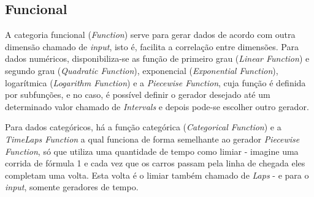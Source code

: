 \documentclass[
	12pt,				%
	openright,			%
	twoside,			%
	a4paper,			%
	english,			%
	brazil				%
	]{abntex2}
\begin{document}
		\subsection{Funcional}
			A categoria funcional (\emph{Function}) serve para gerar dados de acordo com outra dimensão chamado de \emph{input}, isto é, facilita a correlação entre dimensões.
			Para dados numéricos, disponibiliza-se as 
				função de primeiro grau (\emph{Linear Function}) e 
				segundo grau (\emph{Quadratic Function}), 
				exponencial (\emph{Exponential Function}), 
				logarítmica (\emph{Logarithm Function}) e
				a \emph{Piecewise Function}, cuja função é definida por subfunções, e no caso, é possível definir o gerador desejado até um determinado valor chamado de \emph{Intervals} e depois pode-se escolher outro gerador.
			\par
			Para dados categóricos, há a função categórica (\emph{Categorical Function}) e 
			a \emph{TimeLaps Function} a qual funciona de forma semelhante ao gerador \emph{Piecewise Function}, só que utiliza uma quantidade de tempo como limiar - imagine uma corrida de fórmula 1 e cada vez que os carros passam pela linha de chegada eles completam uma volta. Esta volta é o limiar também chamado de \emph{Laps} - e para o \emph{input}, somente geradores de tempo.
\end{document}
